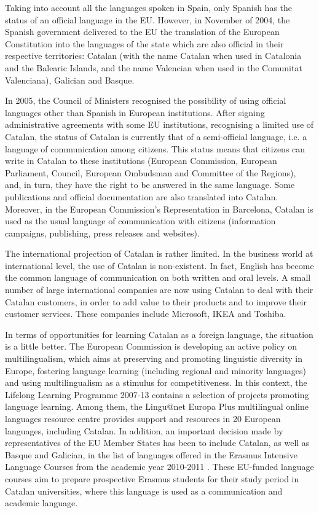 \documentclass[]{../../metanetpaper}
\begin{document}
\begin{multicols}{2}
Taking into account all the languages spoken in Spain, only Spanish has the status of an official language in the EU.  However, in November of 2004, the Spanish government delivered to the EU the translation of the European Constitution into the languages of the state which are also official in their respective territories: Catalan (with the name Catalan when used in Catalonia and the Balearic Islands, and the name Valencian when used in the Comunitat Valenciana), Galician and Basque. 

In 2005, the Council of Ministers recognised the possibility of using official languages other than Spanish in European institutions. After signing administrative agreements with some EU institutions, recognising a limited use of Catalan, the status of Catalan is currently that of a semi-official language, i.e. a language of communication among citizens. This status means that citizens can write in Catalan to these institutions (European Commission, European Parliament, Council, European Ombudsman and Committee of the Regions), and, in turn, they have the right to be answered in the same language. Some publications and official documentation are also translated into Catalan. Moreover, in the European Commission’s Representation in Barcelona, Catalan is used as the usual language of communication with citizens (information campaigns, publishing, press releases and websites).

The international projection of Catalan is rather limited. In the business world at international level, the use of Catalan is non-existent. In fact, English has become the common language of communication on both written and oral levels. A small number of large international companies are now using Catalan to deal with their Catalan customers, in order to add value to their products and to improve their customer services. These companies include Microsoft, IKEA and Toshiba.

In terms of opportunities for learning Catalan as a foreign language, the situation is a little better. The European Commission is developing an active policy on multilingualism, which aims at preserving and promoting linguistic diversity in Europe, fostering language learning (including regional and minority languages) and using multilingualism as a stimulus for competitiveness. In this context, the Lifelong Learning Programme 2007-13 contains a selection of projects promoting language learning. Among them, the Lingu@net Europa Plus multilingual online languages resource centre \cite{CAT-Nota9} provides support and resources in 20 European languages, including Catalan. In addition, an important decision made by representatives of the EU Member States has been to include Catalan, as well as Basque and Galician, in the list of languages offered in the Erasmus Intensive Language Courses from the academic year 2010-2011 \cite{CAT-Nota10}. These EU-funded language courses aim to prepare prospective Erasmus students for their study period in Catalan universities, where this language is used as a communication and academic language.


\end{multicols}
\end{document}
